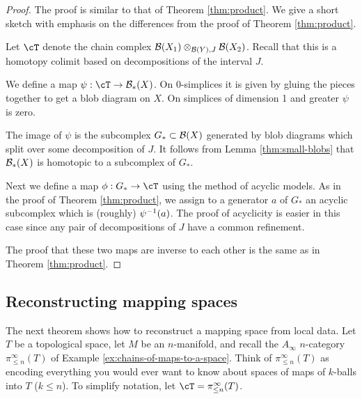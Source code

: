 \begin{proof}
The proof is similar to that of Theorem \ref{thm:product}.
We give a short sketch with emphasis on the differences from 
the proof of Theorem \ref{thm:product}.

Let $\cT$ denote the chain complex ${\mathcal B}(X_1) \otimes_{{\mathcal B}(Y), J} {\mathcal B}(X_2)$.
Recall that this is a homotopy colimit based on decompositions of the interval $J$.

We define a map $\psi:\cT\to \bc_*(X)$.
On 0-simplices it is given
by gluing the pieces together to get a blob diagram on $X$.
On simplices of dimension 1 and greater $\psi$ is zero.

The image of $\psi$ is the subcomplex $G_*\subset {\mathcal B}(X)$ generated by blob diagrams which split
over some decomposition of $J$.
It follows from Lemma \ref{thm:small-blobs} that ${\mathcal B}_*(X)$ is homotopic to 
a subcomplex of $G_*$. 

Next we define a map $\phi:G_*\to \cT$ using the method of acyclic models.
As in the proof of Theorem \ref{thm:product}, we assign to a generator $a$ of $G_*$
an acyclic subcomplex which is (roughly) $\psi^{-1}(a)$.
The proof of acyclicity is easier in this case since any pair of decompositions of $J$ have
a common refinement.

The proof that these two maps are inverse to each other is the same as in
Theorem \ref{thm:product}.
\end{proof}

\medskip

\subsection{Reconstructing mapping spaces}
\label{sec:map-recon}

The next theorem shows how to reconstruct a mapping space from local data.
Let $T$ be a topological space, let $M$ be an $n$-manifold, 
and recall the $A_\infty$ $n$-category $\pi^\infty_{\leq n}(T)$ 
of Example \ref{ex:chains-of-maps-to-a-space}.
Think of $\pi^\infty_{\leq n}(T)$ as encoding everything you would ever
want to know about spaces of maps of $k$-balls into $T$ ($k\le n$).
To simplify notation, let $\cT = \pi^\infty_{\leq n}(T)$.

